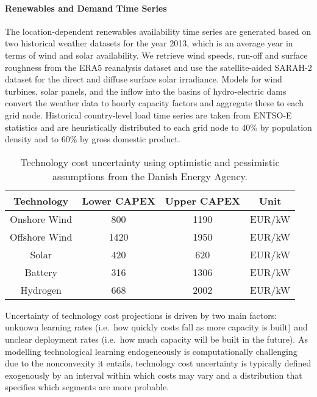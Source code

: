 
\paragraph{Renewables and Demand Time Series}
The location-dependent renewables availability time series are generated based
on two historical weather datasets for the year 2013, which is an average year
in terms of wind and solar availability. We retrieve wind speeds, run-off and
surface roughness from the ERA5 reanalysis dataset and use the satellite-aided
SARAH-2 dataset for the direct and diffuse surface solar irradiance. Models for
wind turbines, solar panels, and the inflow into the basins of hydro-electric
dams convert the weather data to hourly capacity factors and aggregate these to
each grid node. Historical country-level load time series are taken from ENTSO-E
statistics and are heuristically distributed to each grid node to 40\% by
population density and to 60\% by gross domestic product.


\begin{SCtable}
    \begin{small}
        \begin{tabular}{cccc}
            \toprule
            Technology & Lower CAPEX & Upper CAPEX & Unit  \\ \midrule Onshore
            Wind & 800 & 1190 & EUR/kW \\
            Offshore Wind & 1420 & 1950 & EUR/kW \\ %
            Solar & 420 & 620 & EUR/kW \\
            Battery & 316 & 1306 & EUR/kW \\
            Hydrogen & 668 & 2002 & EUR/kW \\ \bottomrule
        \end{tabular}
    \end{small}
    \caption[Technology Cost Uncertainty]{Technology cost uncertainty using
    optimistic and pessimistic assumptions from the Danish Energy
    Agency.\cite{DEA}}
    \label{tab:costuncertainty}
\end{SCtable}


Uncertainty of technology cost projections is driven by two main factors:
unknown learning rates (i.e.~how quickly costs fall as more capacity is built)
and unclear deployment rates (i.e.~how much capacity will be built in the
future).\cite{gritsevskyi_modeling_2000,yeh_review_2012} As modelling
technological learning endogeneously is computationally challenging due to the
nonconvexity it
entails,\cite{heuberger_power_2017,mattsson_learning_2019,lisa_learning2022}
technology cost uncertainty is typically defined exogenously by an interval
within which costs may vary and a distribution that specifies which segments are
more probable.

